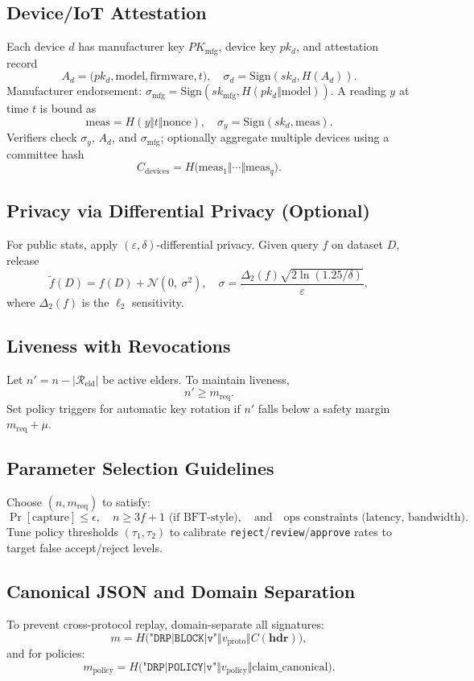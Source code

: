 \documentclass[11pt,a4paper]{article}
\begin{document}
\subsection{Device/I\!oT Attestation}
Each device $d$ has manufacturer key $PK_{\text{mfg}}$, device key $pk_d$, and attestation record
\[
A_d = \big(pk_d, \mathrm{model}, \mathrm{firmware}, t\big),\quad \sigma_d=\mathrm{Sign}(sk_d,H(A_d)).
\]
Manufacturer endorsement: $\sigma_{\text{mfg}}=\mathrm{Sign}(sk_{\text{mfg}}, H(pk_d\Vert \mathrm{model}))$.
A reading $y$ at time $t$ is bound as
\[
\mathrm{meas} = H(y\Vert t\Vert \mathrm{nonce}),\quad \sigma_y=\mathrm{Sign}(sk_d,\mathrm{meas}).
\]
Verifiers check $\sigma_y$, $A_d$, and $\sigma_{\text{mfg}}$; optionally aggregate multiple devices using a committee hash
\[
C_{\text{devices}} = H\!\big(\mathrm{meas}_1 \Vert \cdots \Vert \mathrm{meas}_q\big).
\]

\subsection{Privacy via Differential Privacy (Optional)}
For public stats, apply $(\varepsilon,\delta)$-differential privacy. Given query $f$ on dataset $D$, release
\[
\tilde{f}(D) = f(D) + \mathcal{N}\!\left(0,\ \sigma^2\right),\quad \sigma = \frac{\Delta_2(f)\sqrt{2\ln(1.25/\delta)}}{\varepsilon},
\]
where $\Delta_2(f)$ is the $\ell_2$ sensitivity.

\subsection{Liveness with Revocations}
Let $n' = n - |\mathcal{R}_{\text{eld}}|$ be active elders. To maintain liveness,
\[
n' \ge m_{\mathrm{req}}.
\]
Set policy triggers for automatic key rotation if $n'$ falls below a safety margin $m_{\mathrm{req}}+\mu$.

\subsection{Parameter Selection Guidelines}
Choose $(n,m_{\mathrm{req}})$ to satisfy:
\[
\Pr[\text{capture}] \le \epsilon, \quad n \ge 3f+1\text{ (if BFT-style)}, \quad \text{and}\quad \text{ops constraints (latency, bandwidth)}.
\]
Tune policy thresholds $(\tau_1,\tau_2)$ to calibrate \texttt{reject}/\texttt{review}/\texttt{approve} rates to target false accept/reject levels.

\subsection{Canonical JSON and Domain Separation}
To prevent cross-protocol replay, domain-separate all signatures:
\[
m = H\big(\texttt{"DRP|BLOCK|v"}\Vert v_{\text{proto}} \Vert C(\mathbf{hdr})\big),
\]
and for policies:
\[
m_{\text{policy}} = H\big(\texttt{"DRP|POLICY|v"}\Vert v_{\text{policy}} \Vert \text{claim\_canonical}\big).
\]
\end{document}

